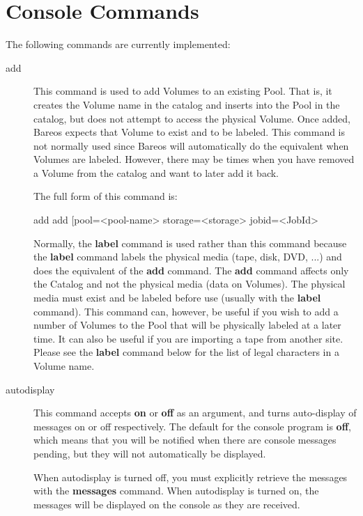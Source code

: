 \section{Console Commands}
    \label{sec:ConsoleCommands}

The following commands are currently implemented:

\begin{description}
\item [add]
   This command is used to add Volumes to an existing Pool.  That is,
   it creates the Volume name in the catalog and inserts into the Pool
   in the catalog, but does not attempt to access the physical Volume.
   Once added, Bareos expects that Volume to exist and to be labeled.
   This command is not normally used since Bareos will
   automatically do the equivalent when Volumes are labeled. However,
   there may be times when you have removed a Volume from the catalog
   and want to later add it back.

   The full form of this command is:

\begin{bconsole}{add}
add [pool=<pool-name> storage=<storage> jobid=<JobId>
\end{bconsole}


   Normally, the {\bf label} command is used rather than this command
   because the {\bf label} command labels the physical media (tape, disk,
   DVD, ...) and does the equivalent of the {\bf add} command.  The {\bf
   add} command affects only the Catalog and not the physical media (data
   on Volumes).  The physical media must exist and be labeled before use
   (usually with the {\bf label} command).  This command can, however, be
   useful if you wish to add a number of Volumes to the Pool that will be
   physically labeled at a later time.  It can also be useful if you are
   importing a tape from another site.  Please see the {\bf label} command
   below for the list of legal characters in a Volume name.

\item [autodisplay]
   This command accepts {\bf on} or {\bf off} as an argument, and turns
   auto-display of messages on or off respectively.  The default for the
   console program is {\bf off}, which means that you will be notified when
   there are console messages pending, but they will not automatically be
   displayed.

   When autodisplay is turned off, you must explicitly retrieve the
   messages with the {\bf messages} command.  When autodisplay is turned
   on, the messages will be displayed on the console as they are received.


\end{description}
